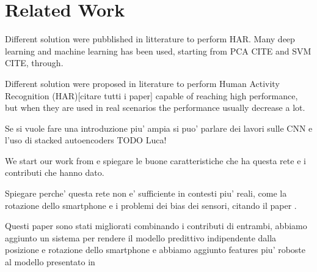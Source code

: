 
\section{Related Work}
\label{sec:related-work}

Different solution were pubblished in litterature to perform HAR. Many deep learning and machine learning has been used, starting from PCA CITE and SVM CITE, through.

Different solution were proposed in literature to perform Human Activity Recognition (HAR)[citare tutti i paper] capable of reaching high performance, but when they are used in real scenarios the performance usually decrease a lot.

Se si vuole fare una introduzione piu' ampia si puo' parlare dei lavori sulle CNN e l'uso di stacked autoencoders TODO Luca!

We start our work from \cite{ignatov2018real} e spiegare le buone caratteristiche che ha questa rete e i contributi che hanno dato.

Spiegare perche' questa rete non e' sufficiente in contesti piu' reali, come la rotazione dello smartphone e i problemi dei bias dei sensori, citando il paper \cite{stisen2015smart}.

Questi paper sono stati migliorati combinando i contributi di entrambi, abbiamo aggiunto un sistema per rendere il modello predittivo indipendente dalla posizione e rotazione dello smartphone e abbiamo aggiunto features piu' roboste al modello presentato in \cite{ignatov2018real}


